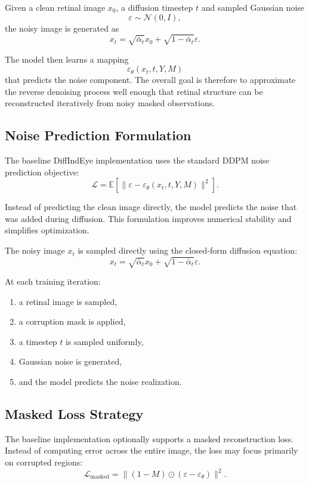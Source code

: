 \documentclass[12pt,oneside]{article}
\newcommand{\E}{\mathbb{E}}
\begin{document}
Given a clean retinal image $x_0$, 
a diffusion timestep $t$
and sampled Gaussian noise
\[
\varepsilon \sim \mathcal{N}(0,I),
\]
the noisy image is generated as
\[
x_t
=
\sqrt{\bar{\alpha}_t}x_0
+
\sqrt{1-\bar{\alpha}_t}\varepsilon.
\]

The model then learns a mapping
\[
\varepsilon_\theta(x_t,t,Y,M)
\]
that predicts the noise component. The overall goal is therefore to approximate the reverse denoising process well enough that retinal structure can be reconstructed iteratively from noisy masked observations.

\subsection*{Noise Prediction Formulation}

The baseline DiffIndEye implementation uses the standard DDPM noise prediction objective:
\[
\mathcal{L}
=
\E
\left[
\|
\varepsilon
-
\varepsilon_\theta(x_t,t,Y,M)
\|^2
\right].
\]

Instead of predicting the clean image directly, the model predicts the noise that was added during diffusion. This formulation improves numerical stability and simplifies optimization.

The noisy image $x_t$
is sampled directly using the closed-form diffusion equation:
\[
x_t
=
\sqrt{\bar{\alpha}_t}x_0
+
\sqrt{1-\bar{\alpha}_t}\varepsilon.
\]

At each training iteration:
\begin{enumerate}
    \item a retinal image is sampled,
    \item a corruption mask is applied,
    \item a timestep $t$ is sampled uniformly,
    \item Gaussian noise is generated,
    \item and the model predicts the noise realization.
\end{enumerate}

\subsection*{Masked Loss Strategy}

The baseline implementation optionally supports a masked reconstruction loss. Instead of computing error across the entire image, the loss may focus primarily on corrupted regions:
\[
\mathcal{L}_{\mathrm{masked}}
=
\|
(1-M)
\odot
(
\varepsilon
-
\varepsilon_\theta
)
\|^2.
\]
\end{document}

